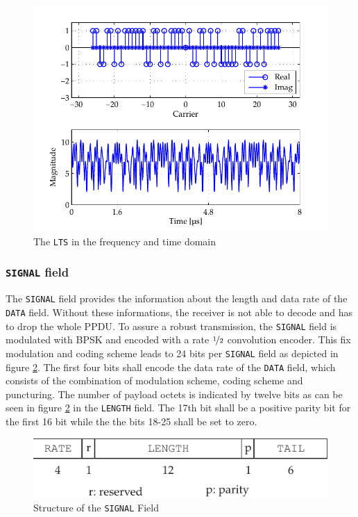 \begin{figure}[ht]
	\centering
		\includegraphics[width=1.00\textwidth]{../kapitel04/figures/LTS.pdf}
	\caption{The \texttt{LTS} in the frequency and time domain}
	\label{fig:LTS}
\end{figure}


\subsubsection{\texttt{SIGNAL} field}

The \texttt{SIGNAL} field provides the information about the length and data rate of the \texttt{DATA} field. Without these informations, the receiver is not able to decode and has to drop the whole \ac{PPDU}. To assure a robust transmission, the \texttt{SIGNAL} field is modulated with BPSK and encoded with a rate $\nicefrac{1}{2}$ convolution encoder. This fix modulation and coding scheme leads to 24 bits per \texttt{SIGNAL} field as depicted in figure \ref{fig:SIGNAL_Frame}. The first four bits shall encode the data rate of the \texttt{DATA} field, which consists of the combination of modulation scheme, coding scheme and puncturing. The number of payload octets is indicated by twelve bits as can be seen in figure \ref{fig:SIGNAL_Frame} in the \texttt{LENGTH} field. The 17th bit shall be a positive parity bit for the first 16 bit while the the bits 18-25 shall be set to zero.
 
\begin{figure}[ht]
	\centering
		\includegraphics{../kapitel04/figures/SIGNAL_Field.pdf}
	\caption{Structure of the \texttt{SIGNAL} Field}
	\label{fig:SIGNAL_Frame}
\end{figure}

